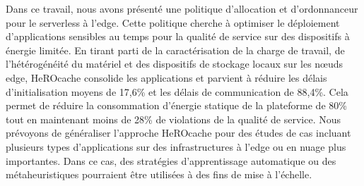 Dans ce travail, nous avons présenté une politique d'allocation et d'ordonnanceur pour le serverless à l'edge. Cette politique cherche à optimiser le déploiement d'applications sensibles au temps pour la qualité de service sur des dispositifs à énergie limitée. En tirant parti de la caractérisation de la charge de travail, de l'hétérogénéité du matériel et des dispositifs de stockage locaux sur les nœuds edge, HeROcache consolide les applications et parvient à réduire les délais d'initialisation moyens de 17,6\% et les délais de communication de 88,4\%. Cela permet de réduire la consommation d'énergie statique de la plateforme de 80\% tout en maintenant moins de 28\% de violations de la qualité de service. Nous prévoyons de généraliser l'approche HeROcache pour des études de cas incluant plusieurs types d'applications sur des infrastructures à l'edge ou en nuage plus importantes. Dans ce cas, des stratégies d'apprentissage automatique ou des métaheuristiques pourraient être utilisées à des fins de mise à l'échelle.
